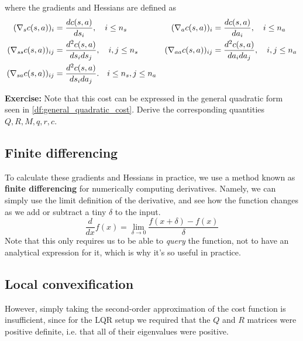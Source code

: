 \documentclass[\main/main]{subfiles}
\begin{document}
where the gradients and Hessians are defined as
\begin{align*}
    (\nabla_s c(s, a))_{i}         & = \frac{d c(s, a)}{d s_i}, \quad i \le n_s
                                          & (\nabla_a c(s, a))_{i}                                               & = \frac{d c(s, a)}{d a_i}, \quad i \le n_a               \\
    (\nabla_{s s} c(s, a))_{ij}  & = \frac{d^2 c(s, a)}{d s_i d s_j}, \quad i, j \le n_s
                                          & (\nabla_{a a} c(s, a))_{ij}                                       & = \frac{d^2 c(s, a)}{d a_i d a_j}, \quad i, j \le n_a \\
    (\nabla_{s a} c(s, a))_{ij} & = \frac{d^2 c(s, a)}{d s_i d a_j}. \quad i \le n_s, j \le n_a
\end{align*}

\textbf{Exercise:} Note that this cost can be expressed in the general quadratic form seen in \autoref{df:general_quadratic_cost}. Derive the corresponding quantities $Q, R, M, q, r, c$.

\subsection{Finite differencing}

To calculate these gradients and Hessians in practice,
we use a method known as \textbf{finite differencing} for numerically computing derivatives.
Namely, we can simply use the limit definition of the derivative,
and see how the function changes as we add or subtract a tiny $\delta$ to the input.
\[
    \frac{d}{dx} f(x) = \lim_{\delta \to 0} \frac{f(x + \delta) - f(x)}{\delta}
\]
Note that this only requires us to be able to \emph{query} the function, not to have an analytical expression for it,
which is why it's so useful in practice.

\subsection{Local convexification}

However, simply taking the second-order approximation of the cost function is insufficient,
since for the LQR setup we required that the $Q$ and $R$ matrices were positive definite, i.e. that all of their eigenvalues were positive.
\end{document}
